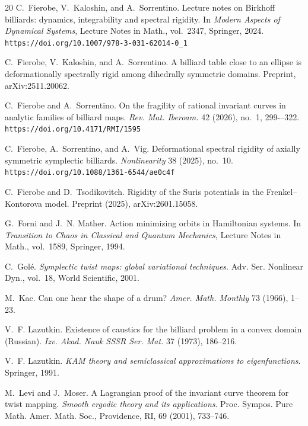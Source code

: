 \documentclass[10pt]{article}
\begin{document}
\begin{thebibliography}{20}
C.~Fierobe, V.~Kaloshin, and A.~Sorrentino.
\newblock Lecture notes on Birkhoff billiards: dynamics, integrability and spectral rigidity.
\newblock In \emph{Modern Aspects of Dynamical Systems}, Lecture Notes in Math., vol.~2347,
Springer, 2024.
\newblock \texttt{https://doi.org/10.1007/978-3-031-62014-0\_1}


C.~Fierobe, V.~Kaloshin, and A.~Sorrentino.
\newblock A billiard table close to an ellipse is deformationally spectrally rigid among dihedrally symmetric domains.
\newblock Preprint, arXiv:2511.20062.

C.~Fierobe and A.~Sorrentino.
\newblock On the fragility of rational invariant curves in analytic families of billiard maps.
\newblock \emph{Rev. Mat. Iberoam.} 42 (2026), no.~1, 299-–322.
\newblock \texttt{https://doi.org/10.4171/RMI/1595}

C.~Fierobe, A.~Sorrentino, and A.~Vig.
\newblock Deformational spectral rigidity of axially symmetric symplectic billiards.
\newblock \emph{Nonlinearity} 38 (2025), no.~10.
\newblock \texttt{https://doi.org/10.1088/1361-6544/ae0c4f}


C.~Fierobe and D.~Tsodikovitch.
\newblock Rigidity of the Suris potentials in the Frenkel--Kontorova model.
\newblock Preprint (2025), arXiv:2601.15058.

G.~Forni and J.~N. Mather.
\newblock Action minimizing orbits in Hamiltonian systems.
\newblock In \emph{Transition to Chaos in Classical and Quantum Mechanics},
Lecture Notes in Math., vol.~1589, Springer, 1994.

C.~Gol\'e.
\newblock \emph{Symplectic twist maps: global variational techniques}.
\newblock Adv. Ser. Nonlinear Dyn., vol.~18, World Scientific, 2001.

M.~Kac.
\newblock Can one hear the shape of a drum?
\newblock \emph{Amer. Math. Monthly} 73 (1966), 1--23.

V.~F. Lazutkin.
\newblock Existence of caustics for the billiard problem in a convex domain (Russian).
\newblock \emph{Izv. Akad. Nauk SSSR Ser. Mat.} 37 (1973), 186--216.

V.~F. Lazutkin.
\newblock \emph{KAM theory and semiclassical approximations to eigenfunctions}.
\newblock Springer, 1991.

M.~Levi and J.~Moser.
\newblock A Lagrangian proof of the invariant curve theorem for twist mapping. 
\newblock \emph{Smooth ergodic theory and its applications}. Proc. Sympos. Pure Math. Amer. Math. Soc., Providence, RI, 69 (2001), 733--746. 


\end{thebibliography}
\end{document}
